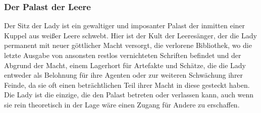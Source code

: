 \documentclass[a4paper,12pt,oneside]{book}
\begin{document}
\subsubsection{Der Palast der Leere}
Der Sitz der Lady ist ein gewaltiger und imposanter Palast der inmitten einer Kuppel aus weißer Leere schwebt. Hier ist der Kult der Leeresänger, der die Lady permanent mit neuer göttlicher Macht versorgt, die verlorene Bibliothek, wo die letzte Ausgabe von ansonsten restlos vernichteten Schriften befindet und der Abgrund der Macht, einem Lagerhort für Artefakte und Schätze, die die Lady entweder als Belohnung für ihre Agenten oder zur weiteren Schwächung ihrer Feinde, da sie oft einen beträchtlichen Teil ihrer Macht in diese gesteckt haben. Die Lady ist die einzige, die den Palast betreten oder verlassen kann, auch wenn sie rein theoretisch in der Lage wäre einen Zugang für Andere zu erschaffen.
\end{document}
